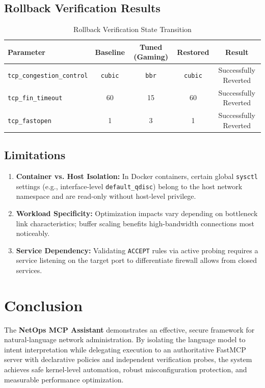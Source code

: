 \documentclass[11pt,a4paper]{article}
\begin{document}
\subsection{Rollback Verification Results}
\begin{table}[h]
\centering
\small
\begin{tabularx}{\textwidth}{lcccc}
\toprule
\textbf{Parameter} & \textbf{Baseline} & \textbf{Tuned (Gaming)} & \textbf{Restored} & \textbf{Result} \\
\midrule
\texttt{tcp\_congestion\_control} & \texttt{cubic} & \texttt{bbr} & \texttt{cubic} & Successfully Reverted \\
\texttt{tcp\_fin\_timeout} & 60 & 15 & 60 & Successfully Reverted \\
\texttt{tcp\_fastopen} & 1 & 3 & 1 & Successfully Reverted \\
\bottomrule
\end{tabularx}
\caption{Rollback Verification State Transition}
\end{table}

\subsection{Limitations}
\begin{enumerate}
    \item \textbf{Container vs. Host Isolation:} In Docker containers, certain global \texttt{sysctl} settings (e.g., interface-level \texttt{default\_qdisc}) belong to the host network namespace and are read-only without host-level privilege.
    \item \textbf{Workload Specificity:} Optimization impacts vary depending on bottleneck link characteristics; buffer scaling benefits high-bandwidth connections most noticeably.
    \item \textbf{Service Dependency:} Validating \texttt{ACCEPT} rules via active probing requires a service listening on the target port to differentiate firewall allows from closed services.
\end{enumerate}

\section{Conclusion}
The \textbf{NetOps MCP Assistant} demonstrates an effective, secure framework for natural-language network administration. By isolating the language model to intent interpretation while delegating execution to an authoritative FastMCP server with declarative policies and independent verification probes, the system achieves safe kernel-level automation, robust misconfiguration protection, and measurable performance optimization.
\end{document}
